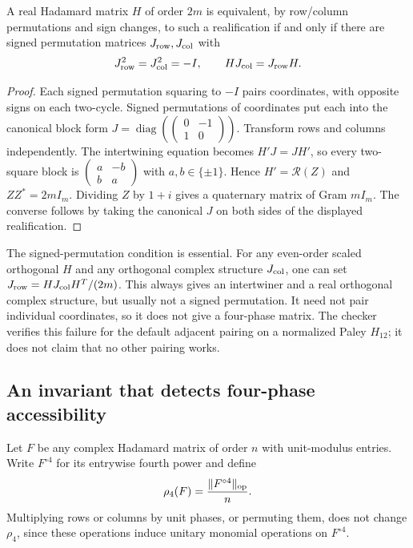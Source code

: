 \begin{proposition}
\label{quat:structure}
A real Hadamard matrix $H$ of order $2m$ is equivalent, by row/column
permutations and sign changes, to such a realification if and only if there are signed
permutation matrices $J_{\rm row},J_{\rm col}$ with
\[
 J_{\rm row}^2=J_{\rm col}^2=-I,\qquad
                         HJ_{\rm col}=J_{\rm row}H.
\]
\end{proposition}
\begin{proof}
Each signed permutation squaring to $-I$ pairs coordinates, with
opposite signs on each two-cycle. Signed permutations of coordinates
put each into the canonical block form
$J=\operatorname{diag}(\left(\begin{smallmatrix}0&-1\\1&0\end{smallmatrix}\right))$.
Transform rows and columns independently. The intertwining equation
becomes $H'J=JH'$, so every two-square block is
$\left(\begin{smallmatrix}a&-b\\b&a\end{smallmatrix}\right)$ with
$a,b\in\{\pm1\}$. Hence $H'=\mathcal R(Z)$ and
$ZZ^*=2mI_m$. Dividing $Z$ by $1+i$ gives a quaternary matrix
of Gram $mI_m$. The converse follows by taking the canonical $J$
on both sides of the displayed realification.
\end{proof}

The signed-permutation condition is essential. For any even-order
scaled orthogonal $H$ and any orthogonal complex structure $J_{\rm col}$,
one can set $J_{\rm row}=HJ_{\rm col}H^T/(2m)$. This always gives
an intertwiner and a real orthogonal complex structure, but usually
not a signed permutation. It need not pair individual coordinates,
so it does not give a four-phase matrix. The checker verifies this
failure for the default adjacent pairing on a normalized Paley $H_{12}$;
it does not claim that no other pairing works.

\subsection{An invariant that detects four-phase accessibility}
Let $F$ be any complex Hadamard matrix of order $n$ with unit-modulus
entries. Write $F^{\circ4}$ for its entrywise fourth power and define
\[
                 \rho_4(F)=\frac{\|F^{\circ4}\|_{\rm op}}n.
\]
Multiplying rows or columns by unit phases, or permuting them, does
not change $\rho_4$, since these operations induce unitary monomial
operations on $F^{\circ4}$.

